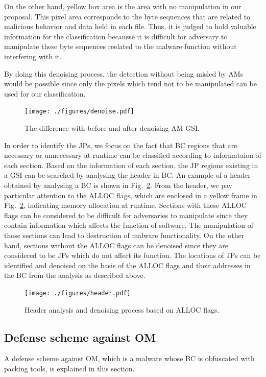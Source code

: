 \documentclass{ieeeaccess}
\newcommand{\myfigurename}{Fig.}
\begin{document}
On the other hand, yellow box area is the area with no manipulation in our proposal.
This pixel area corresponds to the byte sequences that are related to malicious behavior and data held in each file.
Thus, it is judged to hold valuable information for the classification becausse it is difficult for adversary to manipulate these byte sequences reelated to the malware function without interfering with it.

By doing this denoising process, the detection without being misled by AMs would be possible since only the pixels which tend not to be manipulated can be used for our classification.

\begin{figure}[t]
 \centering
 \texttt{[image: ./figures/denoise.pdf]}
 \caption{The difference with before and after denoising AM GSI.} 
 \label{fig:denoise}
\end{figure}

In order to identify the JPs, we focus on the fact that BC regions that are necessary or unnecessary at runtime can be classified according to informataion of each section.
Based on the information of each section, the JP regions existing in a GSI can be searched by analysing the header in BC.
An example of a header obtained by analysing a BC is shown in \myfigurename~\ref{fig:header}.
From the header, we pay particular attention to the ALLOC flags, which are enclosed in a yellow frame in \myfigurename~\ref{fig:header}, indicating memory allocation at runtime.
Sections with these ALLOC flags can be considered to be difficult for adversaries to manipulate since they contain information which affects the function of software.
The manipulation of those sections can lead to destruction of malware functionality. 
On the other hand, sections without the ALLOC flags can be denoised since they are considered to be JPs which do not affect its function.
The locations of JPs can be identified and denoised on the basis of the ALLOC flags and their addresses in the BC from the analysis as described above.
\begin{figure}[t]
 \centering
 \texttt{[image: ./figures/header.pdf]}
	\caption{Header analysis and denoising process based on ALLOC flags.} 
 \label{fig:header}
\end{figure}

\subsection{Defense scheme against OM}
A defense scheme against OM, which is a malware whose BC is obfuscated with packing tools, is explained in this section.
\end{document}
